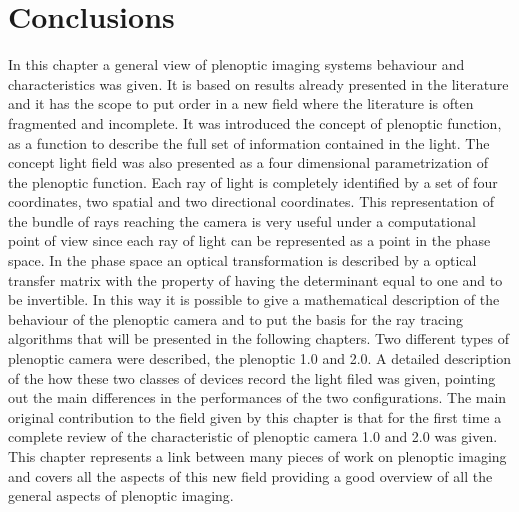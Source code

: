    \section{Conclusions}
   In this chapter a general view of plenoptic imaging systems behaviour and characteristics was given. It is based on results already presented in the literature and it has the scope to put order in a new field where the literature is often fragmented and incomplete. It was introduced the concept of plenoptic function, as a function to describe the full set of information contained in the light. The concept light field was also presented as a four dimensional parametrization of the plenoptic function. Each ray of light is completely identified by a set of four coordinates, two spatial and two directional coordinates. This representation of the bundle of rays reaching the camera is very useful under a computational point of view since each ray of light can be represented as a point in the phase space. In the phase space an optical transformation is described by a optical transfer matrix with the property of having the determinant equal to one and to be invertible. In this way it is possible to give a mathematical description of the behaviour of the plenoptic camera and to put the basis for the ray tracing algorithms that will be presented in the following chapters.
   Two different types of plenoptic camera were described, the plenoptic 1.0 and 2.0. A detailed description of the how these two classes of devices record the light filed was given, pointing out the main differences in the performances of the two configurations.
   The main original contribution to the field given by this chapter is that for the first time a complete review of the characteristic of plenoptic camera 1.0 and 2.0 was given. This chapter represents a link between many pieces of work on plenoptic imaging and covers all the aspects of this new field providing a good overview of all the general aspects of plenoptic imaging.
